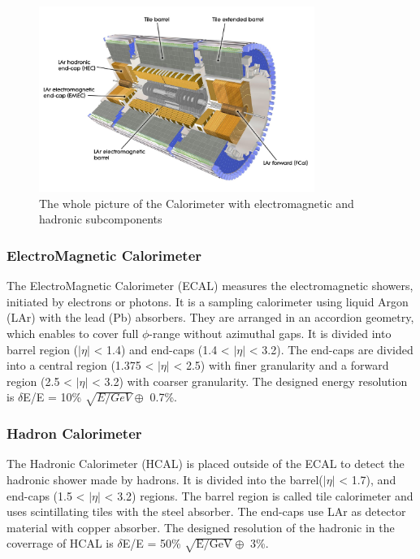\begin{figure}[tbp]
\begin{center}
 \includegraphics[width=0.8\textwidth,keepaspectratio]{figures/detector/Calo}
\caption{
The whole picture of the Calorimeter with electromagnetic and hadronic subcomponents
}
\label{fig:calo}
\end{center}
\end{figure}


\subsubsection{ElectroMagnetic Calorimeter}
The ElectroMagnetic Calorimeter (ECAL) measures the electromagnetic showers, initiated by electrons or photons. It is a sampling calorimeter using liquid Argon (LAr) with the lead (Pb) absorbers. They are arranged in an accordion geometry, which enables to cover full $\phi$-range without azimuthal gaps. It is divided into barrel region ($|\eta|$ < 1.4) and end-caps (1.4 < $|\eta|$ < 3.2). The end-caps are divided into a central region (1.375 < $|\eta|$ < 2.5) with finer granularity and a forward region (2.5 < $|\eta|$ < 3.2) with coarser granularity. The designed energy resolution is $\delta$E/E = 10\% $\sqrt{E/GeV} \oplus$ 0.7\%.

\subsubsection{Hadron Calorimeter}
The Hadronic Calorimeter (HCAL) is placed outside of the ECAL to detect the hadronic shower made by hadrons.
It is divided into the barrel($|\eta|$ < 1.7), and end-caps (1.5 < $|\eta|$ < 3.2) regions. 
The barrel region is called tile calorimeter and uses scintillating tiles with the steel absorber. 
The end-caps use LAr as detector material with copper absorber. 
The designed resolution of the hadronic in the coverrage of HCAL is $\delta$E/E = 50\% $\sqrt{\mathrm{E/GeV}} \oplus$ 3\%.

